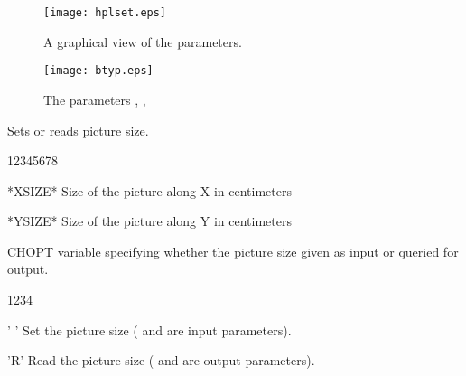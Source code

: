 \begin{figure}[p]
\begin{center}\texttt{[image: hplset.eps]}\end{center}
\caption{A graphical view of the \protect{} parameters.}
\label{fig:HPLSET}
\end{figure}

\begin{figure}[p]
\begin{center}\texttt{[image: btyp.eps]}\end{center}
\caption[The {\tt HPLSET} parameters {\tt PTYP}, {\tt BTYP} and {\tt HTYP}]%
        {The  parameters , , }
\label{TYPE}
\end{figure}
\clearpage


\Action
Sets or reads picture size.
\Pdesc
\begin{DLtt}{12345678}
\item[*XSIZE*] Size of the picture along X in centimeters
\item[*YSIZE*] Size of the picture along Y in centimeters
\item[CHOPT]   \CHARACTER{} variable specifying whether the picture size given 
               as input or queried for output.
\begin{DLtt}{1234}
\item[' '] Set the picture size ( and  are input 
           parameters).
\item['R'] Read the picture size ( and  are output 
           parameters).
\end{DLtt}
\end{DLtt}


